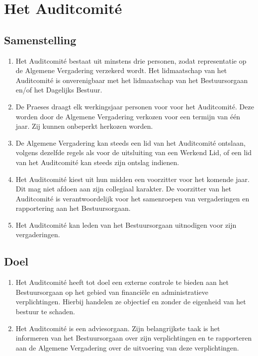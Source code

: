 \section{Het Auditcomit\'e}
    \subsection{Samenstelling}
    \begin{enumerate}
    \item Het Auditcomit\'e bestaat uit minstens drie personen, zodat representatie op de Algemene Vergadering verzekerd wordt. Het lidmaatschap van het Auditcomit\'e is onverenigbaar met het lidmaatschap van het Bestuursorgaan en/of het Dagelijks Bestuur.
    \item De Praeses draagt elk werkingsjaar personen voor voor het Auditcomit\'e. Deze worden door de Algemene Vergadering verkozen voor een termijn van \'e\'en jaar. Zij kunnen onbeperkt herkozen worden.
    \item De Algemene Vergadering kan steeds een lid van het Auditcomit\'e ontslaan, volgens dezelfde regels als voor de uitsluiting van een Werkend Lid, of een lid van het Auditcomit\'e kan steeds zijn ontslag indienen.
    \item Het Auditcomit\'e kiest uit hun midden een voorzitter voor het komende jaar. Dit mag niet afdoen aan zijn collegiaal karakter. De voorzitter van het Auditcomit\'e is verantwoordelijk voor het samenroepen van vergaderingen en rapportering aan het Bestuursorgaan. 
    \item Het Auditcomit\'e kan leden van het Bestuursorgaan uitnodigen voor zijn vergaderingen.
    \end{enumerate}

    \subsection{Doel}
    \begin{enumerate}
    \item Het Auditcomit\'e heeft tot doel een externe controle te bieden aan het Bestuursorgaan op het gebied van financi\"ele en administratieve verplichtingen. Hierbij handelen ze objectief en zonder de eigenheid van het bestuur te schaden.
    \item Het Auditcomit\'e is een adviesorgaan. Zijn belangrijkste taak is het informeren van het Bestuursorgaan over zijn verplichtingen en te rapporteren aan de Algemene Vergadering over de uitvoering van deze verplichtingen.
    \end{enumerate}


